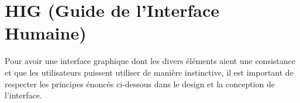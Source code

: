\section{HIG (Guide de l'Interface Humaine)}
Pour avoir une interface graphique dont les divers \'el\'ements aient une consistance et que les utilisateurs puissent utiliser de mani\`ere instinctive, il est important de respecter les principes \'enonc\'es ci-dessous dans le design et la conception de l'interface.

